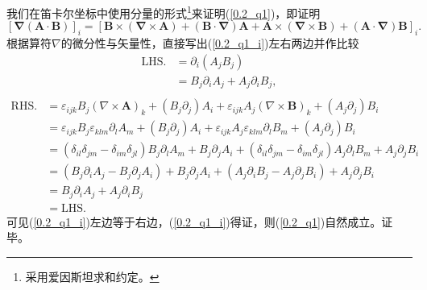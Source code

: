     
    我们在笛卡尔坐标中使用分量的形式\footnote{采用爱因斯坦求和约定。}来证明(\ref{0.2_q1})，即证明
    \begin{equation}
        \boldsymbol{
        \left[\nabla({A}\cdot {B})\right]}_i \boldsymbol{= 
         \left[{B}\times(\nabla\times {A}) + ({B}\cdot \nabla){A} 
        + {A}\times(\nabla\times {B}) + ({A}\cdot \nabla){B}\right]}_i.
        \label{0.2_q1_i}
    \end{equation}
    根据算符$\nabla$的微分性与矢量性，直接写出(\ref{0.2_q1_i})左右两边并作比较
    \begin{equation}
        \begin{aligned}
            \mathrm{LHS.} 
            & = \partial_i (A_j B_j) \\
            & = B_j \partial_i A_j + A_j \partial_i B_j, \\
        \end{aligned}
    \end{equation}
    \begin{equation}
        \begin{aligned}
            \mathrm{RHS.} 
            & = \varepsilon_{ijk} B_j (\nabla\times \boldsymbol{A})_k + (B_j \partial_j)A_i + \varepsilon_{ijk} A_j (\nabla\times \boldsymbol{B})_k + (A_j \partial_j)B_i \\
            & = \varepsilon_{ijk} B_j \varepsilon_{klm}\partial_l A_m + (B_j \partial_j)A_i + \varepsilon_{ijk} A_j \varepsilon_{klm}\partial_l B_m + (A_j \partial_j)B_i \\
            & = (\delta_{il}\delta_{jm}-\delta_{im}\delta_{jl})B_j\partial_l A_m + B_j \partial_j A_i + (\delta_{il}\delta_{jm}-\delta_{im}\delta_{jl})A_j\partial_l B_m + A_j \partial_j B_i \\
            & = (B_j \partial_i A_j - B_j \partial_j A_i) + B_j \partial_j A_i + (A_j \partial_i B_j - A_j \partial_j B_i) + A_j \partial_j B_i \\
            & = B_j \partial_i A_j + A_j \partial_i B_j \\
            & = \mathrm{LHS.} 
        \end{aligned}
    \end{equation}
    可见(\ref{0.2_q1_i})左边等于右边，(\ref{0.2_q1_i})得证，则(\ref{0.2_q1})自然成立。证毕。
    
